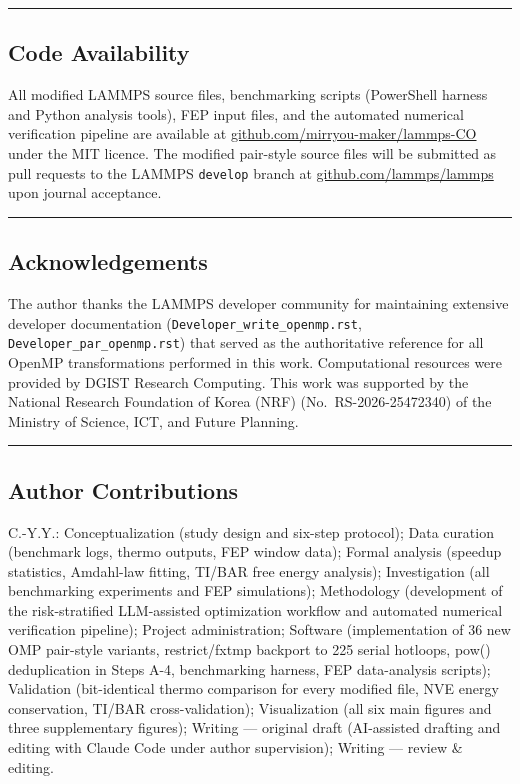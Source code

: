 \documentclass[
  11pt,
]{article}
\begin{document}
\begin{center}\rule{0.5\linewidth}{0.5pt}\end{center}

\subsection{Code Availability}\label{code-availability}

All modified LAMMPS source files, benchmarking scripts (PowerShell
harness and Python analysis tools), FEP input files, and the automated
numerical verification pipeline are available at
\href{https://github.com/mirryou-maker/lammps-CO}{github.com/mirryou-maker/lammps-CO}
under the MIT licence. The modified pair-style source files will be
submitted as pull requests to the LAMMPS \texttt{develop} branch at
\href{https://github.com/lammps/lammps}{github.com/lammps/lammps} upon
journal acceptance.

\begin{center}\rule{0.5\linewidth}{0.5pt}\end{center}

\subsection{Acknowledgements}\label{acknowledgements}

The author thanks the LAMMPS developer community for maintaining
extensive developer documentation
(\texttt{Developer\_write\_openmp.rst},
\texttt{Developer\_par\_openmp.rst}) that served as the authoritative
reference for all OpenMP transformations performed in this work.
Computational resources were provided by DGIST Research Computing. This
work was supported by the National Research Foundation of Korea (NRF)
(No.~RS-2026-25472340) of the Ministry of Science, ICT, and Future
Planning.

\begin{center}\rule{0.5\linewidth}{0.5pt}\end{center}

\subsection{Author Contributions}\label{author-contributions}

C.-Y.Y.: Conceptualization (study design and six-step protocol); Data
curation (benchmark logs, thermo outputs, FEP window data); Formal
analysis (speedup statistics, Amdahl-law fitting, TI/BAR free energy
analysis); Investigation (all benchmarking experiments and FEP
simulations); Methodology (development of the risk-stratified
LLM-assisted optimization workflow and automated numerical verification
pipeline); Project administration; Software (implementation of 36 new
OMP pair-style variants, restrict/fxtmp backport to 225 serial hotloops,
pow() deduplication in Steps A-4, benchmarking harness, FEP
data-analysis scripts); Validation (bit-identical thermo comparison for
every modified file, NVE energy conservation, TI/BAR cross-validation);
Visualization (all six main figures and three supplementary figures);
Writing --- original draft (AI-assisted drafting and editing with Claude
Code under author supervision); Writing --- review \& editing.
\end{document}
